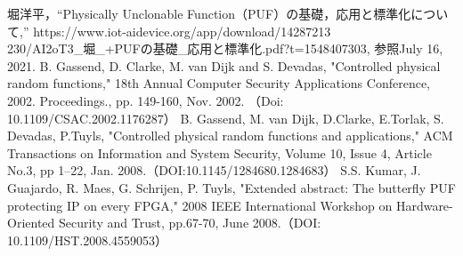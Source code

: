 \documentclass[technicalreport]{ieicej} %
\begin{document}
\begin{thebibliography}{99}
  堀洋平，“Physically Unclonable Function（PUF）の基礎，応用と標準化について,” https://www.iot-aidevice.org/app/download/14287213\\
  230/AI2oT3\_堀\_+PUFの基礎\_応用と標準化.pdf?t=1548407303,
  参照July 16, 2021.
  B. Gassend, D. Clarke, M. van Dijk and S. Devadas, "Controlled physical random functions,"
  18th Annual Computer Security Applications Conference, 2002. Proceedings.,
  pp. 149-160, Nov. 2002. （Doi: 10.1109/CSAC.2002.1176287）
  B. Gassend, M. van Dijk, D.Clarke, E.Torlak, S. Devadas, P.Tuyls,
  "Controlled physical random functions and applications,"
  ACM Transactions on Information and System Security, Volume 10, Issue 4, Article No.3, pp 1–22,
  Jan. 2008.（DOI:10.1145/1284680.1284683）
  S.S. Kumar, J. Guajardo, R. Maes, G. Schrijen, P. Tuyls,
  "Extended abstract: The butterfly PUF protecting IP on every FPGA,"
  2008 IEEE International Workshop on Hardware-Oriented Security and Trust, pp.67-70,
  June 2008.（DOI: 10.1109/HST.2008.4559053）


\end{thebibliography}
\end{document}
